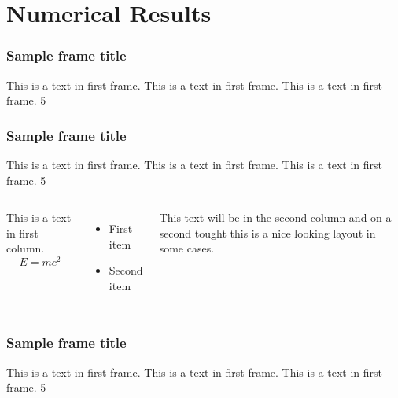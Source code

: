 \documentclass{beamer}
\begin{document}

\section{Numerical Results}


\begin{frame}
\frametitle{Sample frame title}
This is a text in first frame. This is a text in first frame. This is a text in first frame.
\SI{5}{\nT}
\end{frame}


\begin{frame}
\frametitle{Sample frame title}
This is a text in first frame. This is a text in first frame. This is a text in first frame.
\SI{5}{\nT}

\begin{columns}
This is a text in first column.
$$E=mc^2$$
\begin{itemize}
\item First item
\item Second item
\end{itemize}
This text will be in the second column
and on a second tought this is a nice looking
layout in some cases.
\end{columns}

\end{frame}


\begin{frame}
\frametitle{Sample frame title}
This is a text in first frame. This is a text in first frame. This is a text in first frame.
\SI{5}{\nT}
\end{frame}
\end{document}
